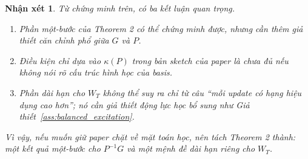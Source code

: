 \documentclass[11pt,a4paper]{article}
\newtheorem{remark}{Nhận xét}
\begin{document}
\begin{remark}
Từ chứng minh trên, có ba kết luận quan trọng.
\begin{enumerate}[label=(\roman*)]
    \item Phần một-bước của Theorem 2 có thể chứng minh được, nhưng cần thêm giả thiết căn chỉnh phổ giữa $G$ và $P$.
    \item Điều kiện chỉ dựa vào $\kappa(P)$ trong bản sketch của paper là chưa đủ nếu không nói rõ cấu trúc hình học của basis.
    \item Phần dài hạn cho $W_T$ không thể suy ra chỉ từ câu ``mỗi update có hạng hiệu dụng cao hơn''; nó cần giả thiết động lực học bổ sung như Giả thiết~\ref{ass:balanced_excitation}.
\end{enumerate}
Vì vậy, nếu muốn giữ paper chặt về mặt toán học, nên tách Theorem 2 thành: một kết quả một-bước cho $P^{-1}G$ và một mệnh đề dài hạn riêng cho $W_T$.
\end{remark}
\end{document}
